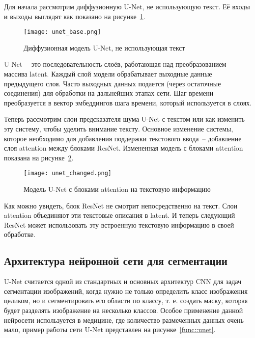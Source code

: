 Для начала рассмотрим диффузионную U-Net, не использующую текст. Её входы и выходы выглядят как показано на рисунке~\ref{func::unet_base}.

\begin{figure}[ht]
    \centering
    \texttt{[image: unet\_base.png]}
    \caption{Диффузионная модель  U-Net, не использующая текст}
    \label{func::unet_base}
\end{figure}

U-Net~-- это последовательность слоёв, работающая над преобразованием массива latent. Каждый слой модели обрабатывает выходные данные предыдущего слоя. Часто выходных данных подается (через остаточные соединения) для обработки на дальнейших этапах сети. Шаг времени преобразуется в вектор эмбеддингов шага времени, который используется в слоях.

Теперь рассмотрим слои предсказателя шума U-Net с текстом или как изменить эту систему, чтобы уделить внимание тексту. Основное изменение системы, которое необходимо для добавления поддержки текстового ввода~-- добавление слоя attention между блоками ResNet. Измененная модель с блоками attention показана на рисунке~\ref{func::unet_changed}.

\begin{figure}[ht]
    \centering
    \texttt{[image: unet\_changed.png]}
    \caption{Модель U-Net с блоками attention на текстовую информацию}
    \label{func::unet_changed}
\end{figure}

Как можно увидеть, блок ResNet не смотрит непосредственно на текст. Слои attention объединяют эти текстовые описания в latent. И теперь следующий ResNet может использовать эту встроенную текстовую информацию в своей обработке.

\subsection{Архитектура нейронной сети для сегментации}

U-Net считается одной из стандартных и основных архитектур CNN для задач сегментации изображений, когда нужно не только определить класс изображения целиком, но и сегментировать его области по классу, т. е. создать маску, которая будет разделять изображение на несколько классов. Особое применение данной нейросети используется в медицине, где количество размеченных данных очень мало, пример работы сети U-Net представлен на рисунке~\ref{func::unet}.  

